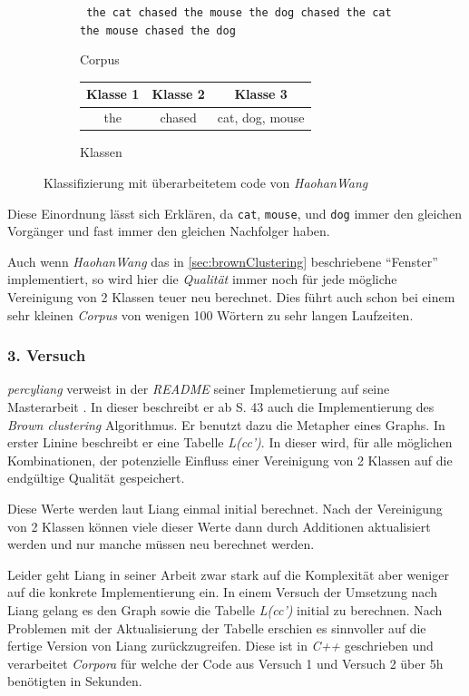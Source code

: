         \begin{figure}[H]
			\centering
            \begin{subfigure}{.45\textwidth}
                \centering
  				\texttt{
                the cat chased the mouse \linebreak
  				the dog chased the cat \linebreak
  				the mouse chased the dog}
                \caption{Corpus}
            \end{subfigure}
            \begin{subfigure}{.45\textwidth}
                \centering
                \begin{tabular}{ c | c | c }
                	Klasse 1 & Klasse 2 & Klasse 3 \\ \hline
                    the & chased & cat, dog, mouse \\
                \end{tabular}
  				\caption{Klassen}
            \end{subfigure}
            \caption{Klassifizierung mit überarbeitetem code von \emph{HaohanWang}}
			\label{fig:clusterCatDogAndMouse}
		\end{figure}

		Diese Einordnung lässt sich Erklären, da \texttt{cat}, \texttt{mouse}, und \texttt{dog} immer den gleichen Vorgänger und fast immer den gleichen Nachfolger haben.


		Auch wenn \emph{HaohanWang} das in \autoref{sec:brownClustering} beschriebene \enquote{Fenster} implementiert, so wird hier die \emph{Qualität} immer noch für jede mögliche Vereinigung von 2 Klassen teuer neu berechnet. Dies führt auch schon bei einem sehr kleinen \emph{Corpus} von wenigen 100 Wörtern zu sehr langen Laufzeiten.
	
    \newpage
	\subsubsection*{3. Versuch}
    \label{sec:thirdTry}
        \emph{percyliang} verweist in der \emph{README} seiner Implemetierung auf seine Masterarbeit \parencite{percyliang:meng}. In dieser beschreibt er ab S. 43 auch die Implementierung des \emph{Brown clustering} Algorithmus. Er benutzt dazu die Metapher eines Graphs. In erster Linine beschreibt er eine Tabelle \emph{L(cc')}. In dieser wird, für alle möglichen Kombinationen, der potenzielle Einfluss einer Vereinigung von 2 Klassen auf die endgültige Qualität gespeichert. \parencite[S. 47]{percyliang:meng}
  
		Diese Werte werden laut Liang einmal initial berechnet. Nach der Vereinigung von 2 Klassen können viele dieser Werte dann durch Additionen aktualisiert werden und nur manche müssen neu berechnet werden. 

		Leider geht Liang in seiner Arbeit zwar stark auf die Komplexität aber weniger auf die konkrete Implementierung ein. In einem Versuch der Umsetzung nach Liang gelang es den Graph sowie die Tabelle \emph{L(cc')} initial zu berechnen. Nach Problemen mit der Aktualisierung der Tabelle erschien es sinnvoller auf die fertige Version von Liang zurückzugreifen. Diese ist in \emph{C++} geschrieben und verarbeitet \emph{Corpora} für welche der Code aus Versuch 1 und Versuch 2 über 5h benötigten in Sekunden. 